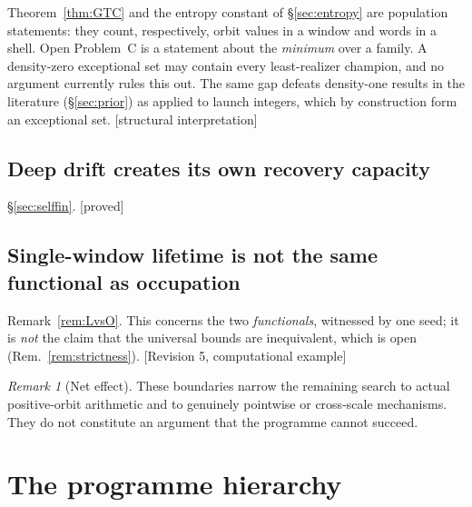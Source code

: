 \documentclass[11pt]{article}
\theoremstyle{plain}
\theoremstyle{definition}
\theoremstyle{remark}
\newtheorem{remark}[theorem]{Remark}
\newcommand{\status}[1]{\textsf{\footnotesize[#1]}}
\begin{document}
Theorem~\ref{thm:GTC} and the entropy constant of \S\ref{sec:entropy} are population statements:
they count, respectively, orbit values in a window and words in a shell. Open Problem~C is a
statement about the \emph{minimum} over a family. A density-zero exceptional set may contain every
least-realizer champion, and no argument currently rules this out. The same gap defeats
density-one results in the literature (\S\ref{sec:prior}) as applied to launch integers, which by
construction form an exceptional set. \status{structural interpretation}

\subsection{Deep drift creates its own recovery capacity}

\S\ref{sec:selffin}. \status{proved}

\subsection{Single-window lifetime is not the same functional as occupation}

Remark~\ref{rem:LvsO}. This concerns the two \emph{functionals}, witnessed by one seed; it is
\emph{not} the claim that the universal bounds are inequivalent, which is open
(Rem.~\ref{rem:strictness}). \status{Revision 5, computational example}

\begin{remark}[Net effect]
These boundaries narrow the remaining search to actual positive-orbit arithmetic and to genuinely
pointwise or cross-scale mechanisms. They do not constitute an argument that the programme cannot
succeed.
\end{remark}

\section{The programme hierarchy}\label{sec:hierarchy}
\end{document}
